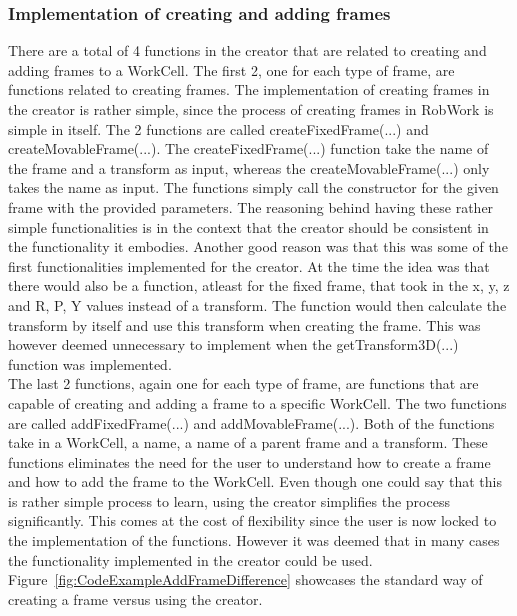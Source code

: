 \subsubsection{Implementation of creating and adding frames}
There are a total of 4 functions in the creator that are related to creating and adding frames to a WorkCell. The first 2, one for each type of frame, are functions related to creating frames. The implementation of creating frames in the creator is rather simple, since the process of creating frames in RobWork is simple in itself. The 2 functions are called createFixedFrame(...) and createMovableFrame(...). The createFixedFrame(...) function take the name of the frame and a transform as input, whereas the createMovableFrame(...) only takes the name as input. The functions simply call the constructor for the given frame with the provided parameters. The reasoning behind having these rather simple functionalities is in the context that the creator should be consistent in the functionality it embodies. Another good reason was that this was some of the first functionalities implemented for the creator. At the time the idea was that there would also be a function, atleast for the fixed frame, that took in the x, y, z and R, P, Y values instead of a transform. The function would then calculate the transform by itself and use this transform when creating the frame. This was however deemed unnecessary to implement when the getTransform3D(...) function was implemented.\\

The last 2 functions, again one for each type of frame, are functions that are capable of creating and adding a frame to a specific WorkCell. The two functions are called addFixedFrame(...) and addMovableFrame(...). Both of the functions take in a WorkCell, a name, a name of a parent frame and a transform. These functions eliminates the need for the user to understand how to create a frame and how to add the frame to the WorkCell. Even though one could say that this is rather simple process to learn, using the creator simplifies the process significantly. This comes at the cost of flexibility since the user is now locked to the implementation of the functions. However it was deemed that in many cases the functionality implemented in the creator could be used. Figure~\ref{fig:CodeExampleAddFrameDifference} showcases the standard way of creating a frame versus using the creator.

